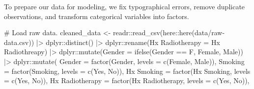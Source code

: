 \documentclass[
  letterpaper,
  DIV=11,
  numbers=noendperiod]{scrartcl}
\newenvironment{Shaded}{\begin{snugshade}}{\end{snugshade}}
\newcommand{\AttributeTok}[1]{\textcolor[rgb]{0.40,0.45,0.13}{#1}}
\newcommand{\CommentTok}[1]{\textcolor[rgb]{0.37,0.37,0.37}{#1}}
\newcommand{\FunctionTok}[1]{\textcolor[rgb]{0.28,0.35,0.67}{#1}}
\newcommand{\NormalTok}[1]{\textcolor[rgb]{0.00,0.23,0.31}{#1}}
\newcommand{\OtherTok}[1]{\textcolor[rgb]{0.00,0.23,0.31}{#1}}
\newcommand{\SpecialCharTok}[1]{\textcolor[rgb]{0.37,0.37,0.37}{#1}}
\newcommand{\StringTok}[1]{\textcolor[rgb]{0.13,0.47,0.30}{#1}}
\begin{document}
To prepare our data for modeling, we fix typographical errors, remove
duplicate observations, and transform categorical variables into
factors.

\begin{Shaded}
\begin{Highlighting}[]
\CommentTok{\#\textquotesingle{} Load raw data.}
\NormalTok{cleaned\_data }\OtherTok{\textless{}{-}} 
\NormalTok{  readr}\SpecialCharTok{::}\FunctionTok{read\_csv}\NormalTok{(here}\SpecialCharTok{::}\FunctionTok{here}\NormalTok{(}\StringTok{\textquotesingle{}data/raw{-}data.csv\textquotesingle{}}\NormalTok{)) }\SpecialCharTok{|\textgreater{}}
\NormalTok{  dplyr}\SpecialCharTok{::}\FunctionTok{distinct}\NormalTok{() }\SpecialCharTok{|\textgreater{}}
\NormalTok{  dplyr}\SpecialCharTok{::}\FunctionTok{rename}\NormalTok{(}\StringTok{\textasciigrave{}}\AttributeTok{Hx Radiotherapy}\StringTok{\textasciigrave{}} \OtherTok{=} \StringTok{\textquotesingle{}Hx Radiothreapy\textquotesingle{}}\NormalTok{) }\SpecialCharTok{|\textgreater{}}
\NormalTok{  dplyr}\SpecialCharTok{::}\FunctionTok{mutate}\NormalTok{(}\AttributeTok{Gender =} \FunctionTok{ifelse}\NormalTok{(Gender }\SpecialCharTok{==} \StringTok{\textquotesingle{}F\textquotesingle{}}\NormalTok{, }\StringTok{\textquotesingle{}Female\textquotesingle{}}\NormalTok{, }\StringTok{\textquotesingle{}Male\textquotesingle{}}\NormalTok{)) }\SpecialCharTok{|\textgreater{}}
\NormalTok{  dplyr}\SpecialCharTok{::}\FunctionTok{mutate}\NormalTok{(}
    \AttributeTok{Gender =} \FunctionTok{factor}\NormalTok{(Gender, }\AttributeTok{levels =} \FunctionTok{c}\NormalTok{(}\StringTok{\textquotesingle{}Female\textquotesingle{}}\NormalTok{, }\StringTok{\textquotesingle{}Male\textquotesingle{}}\NormalTok{)),}
    \AttributeTok{Smoking =} \FunctionTok{factor}\NormalTok{(Smoking, }\AttributeTok{levels =} \FunctionTok{c}\NormalTok{(}\StringTok{\textquotesingle{}Yes\textquotesingle{}}\NormalTok{, }\StringTok{\textquotesingle{}No\textquotesingle{}}\NormalTok{)),}
    \StringTok{\textasciigrave{}}\AttributeTok{Hx Smoking}\StringTok{\textasciigrave{}} \OtherTok{=} \FunctionTok{factor}\NormalTok{(}\StringTok{\textasciigrave{}}\AttributeTok{Hx Smoking}\StringTok{\textasciigrave{}}\NormalTok{, }\AttributeTok{levels =} \FunctionTok{c}\NormalTok{(}\StringTok{\textquotesingle{}Yes\textquotesingle{}}\NormalTok{, }\StringTok{\textquotesingle{}No\textquotesingle{}}\NormalTok{)),}
    \StringTok{\textasciigrave{}}\AttributeTok{Hx Radiotherapy}\StringTok{\textasciigrave{}} \OtherTok{=} \FunctionTok{factor}\NormalTok{(}\StringTok{\textasciigrave{}}\AttributeTok{Hx Radiotherapy}\StringTok{\textasciigrave{}}\NormalTok{, }\AttributeTok{levels =} \FunctionTok{c}\NormalTok{(}\StringTok{\textquotesingle{}Yes\textquotesingle{}}\NormalTok{, }\StringTok{\textquotesingle{}No\textquotesingle{}}\NormalTok{)),}

\end{Highlighting}
\end{Shaded}
\end{document}
